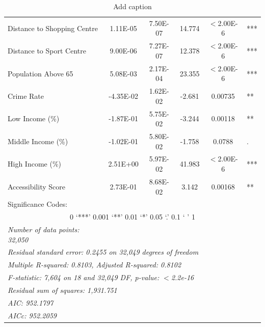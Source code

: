 \begin{table}[!ht]
\begin{tabular}{lccccc}
    Distance to Shopping Centre & 1.11E-05 & 7.50E-07 & 14.774 & \multicolumn{1}{c}{$<$2.00E-6} & \multicolumn{1}{l}{***} \\
    Distance to Sport Centre & 9.00E-06 & 7.27E-07 & 12.378 & \multicolumn{1}{c}{$<$2.00E-6} & \multicolumn{1}{l}{***} \\
    Population Above 65 & 5.08E-03 & 2.17E-04 & 23.355 & \multicolumn{1}{c}{$<$2.00E-6} & \multicolumn{1}{l}{***} \\
    Crime Rate & -4.35E-02 & 1.62E-02 & -2.681 & 0.00735 & \multicolumn{1}{l}{**} \\
    Low Income (\%) & -1.87E-01 & 5.75E-02 & -3.244 & 0.00118 & \multicolumn{1}{l}{**} \\
    Middle Income (\%) & -1.02E-01 & 5.80E-02 & -1.758 & 0.0788 & \multicolumn{1}{l}{.} \\
    High Income (\%) & 2.51E+00 & 5.97E-02 & 41.983 & \multicolumn{1}{c}{$<$2.00E-6} & \multicolumn{1}{l}{***} \\
    Accessibility Score & 2.73E-01 & 8.68E-02 & 3.142 & 0.00168 & \multicolumn{1}{l}{**} \\
    \midrule
    Significance Codes: &       &       &       &       &  \\
    \multicolumn{6}{c}{ 0 ‘***’ 0.001 ‘**’ 0.01 ‘*’ 0.05 ‘.’ 0.1 ‘ ’ 1} \\
    \textit{Number of data points: 32,050} &       &       &       &       &  \\
    \multicolumn{6}{l}{\textit{Residual standard error: 0.2455 on 32,049 degrees of freedom}} \\
    \multicolumn{6}{l}{\textit{Multiple R-squared: 0.8103, Adjusted R-squared: 0.8102}} \\
    \multicolumn{6}{l}{\textit{F-statistic: 7,604 on 18 and 32,049 DF,  p-value: $<$2.2e-16}} \\
    \multicolumn{6}{l}{\textit{Residual sum of squares: 1,931.751}} \\
    \multicolumn{6}{l}{\textit{AIC:  952.1797}} \\
    \multicolumn{6}{l}{\textit{AICc:  952.2059}}
    \end{tabular}%
    \caption{Add caption}
  \label{tab:ols_results}%
\end{table}%

